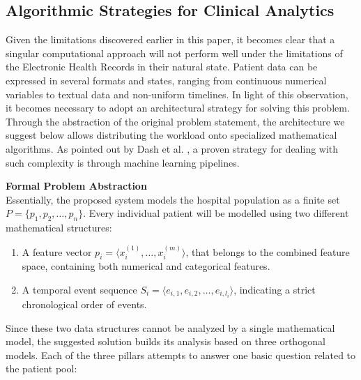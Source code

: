 \subsection{Algorithmic Strategies for Clinical Analytics}

Given the limitations discovered earlier in this paper, it becomes clear that a singular computational approach will not perform well under the limitations of the Electronic Health Records in their natural state. Patient data can be expressed in several formats and states, ranging from continuous numerical variables to textual data and non-uniform timelines. In light of this observation, it becomes necessary to adopt an architectural strategy for solving this problem. Through the abstraction of the original problem statement, the architecture we suggest below allows distributing the workload onto specialized mathematical algorithms. As pointed out by Dash et al. \cite{dash2019}, a proven strategy for dealing with such complexity is through machine learning pipelines.

\textbf{Formal Problem Abstraction} \\
Essentially, the proposed system models the hospital population as a finite set $P = \{p_1, p_2, \dots, p_n\}$. Every individual patient will be modelled using two different mathematical structures:
\begin{enumerate}
    \item A feature vector $p_i = \langle x_i^{(1)}, \dots, x_i^{(m)} \rangle$, that belongs to the combined feature space, containing both numerical and categorical features.
    \item A temporal event sequence $S_i = \langle e_{i,1}, e_{i,2}, \dots, e_{i,l_i} \rangle$, indicating a strict chronological order of events.
\end{enumerate}

\vspace{1em}

Since these two data structures cannot be analyzed by a single mathematical model, the suggested solution builds its analysis based on three orthogonal models. Each of the three pillars attempts to answer one basic question related to the patient pool:

\vspace{1em}

